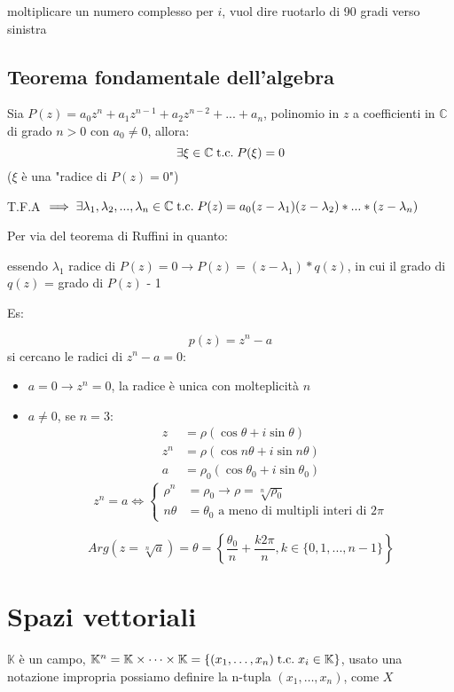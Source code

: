\documentclass[a4paper,12pt]{article}
\begin{document}
	moltiplicare un numero complesso per $i$, vuol dire ruotarlo di 90 gradi verso sinistra
	
	\subsection{Teorema fondamentale dell'algebra}
	Sia $P(z) = a_0z^n + a_1z^{n-1} + a_2z^{n-2} + ... + a_n$, polinomio in $z$ a coefficienti in $\mathbb{C}$ di grado $n > 0$ con $a_0 \not = 0$, allora:
	\[\exists \xi \in \mathbb{C} \;\text{t.c.}\; P(\xi) = 0\]
	($\xi$ è una "radice di $P(z) = 0$")
	
	T.F.A $\implies \exists \lambda_1, \lambda_2, ..., \lambda_n \in \mathbb{C} \;\text{t.c.}\; P(z) = a_0(z - \lambda_1)(z - \lambda_2) * ... * (z - \lambda_n)$
	
	Per via del teorema di Ruffini in quanto:
	\begin{center}
		essendo $\lambda_1$ radice di $P(z) = 0 \rightarrow P(z) = (z - \lambda_1)*q(z)$, in cui il grado di $q(z)$ = grado di $P(z)$ - 1
	\end{center}
	
	Es:
	
	\[p(z) = z^n - a\]
	si cercano le radici di $z^n - a = 0$:
	\begin{itemize}
		\item $a = 0 \rightarrow z^n = 0$, la radice è unica con molteplicità $n$
		\item $a \not = 0$, se $n = 3$:
		\[
		\begin{aligned}
			z &= \rho(\cos\theta + i\sin\theta) \\
			z^n &= \rho(\cos n\theta + i\sin n\theta) \\
			a \, \, &= \rho_0(\cos\theta_0 + i\sin\theta_0)
		\end{aligned}
		\]
		\[z^n = a \iff \left\{
		\begin{aligned}
			\rho^n &= \rho_0 \rightarrow \rho = \sqrt[n]{\rho_0}\\
			n\theta &= \theta_0 \text{ a meno di multipli interi di } 2\pi
		\end{aligned} \right.\]
		
		\[Arg(z = \sqrt[n]{a}) = \theta = \left\{\frac{\theta_0}{n} + \frac{k2\pi}{n}, k \in \{0, 1, ..., n -1\}\right\}\]
		
	\end{itemize}
	
	\section{Spazi vettoriali}
	$\mathbb{K}$ è un campo, $\mathbb{K}^n = \mathbb{K} \times \dots \times \mathbb{K} = \{(x_1, \dots , x_n) \;\text{t.c.}\; x_i \in \mathbb{K}\}$, usato una notazione impropria possiamo definire la n-tupla $(x_1, \dots , x_n)$, come $X$
	
\end{document}
